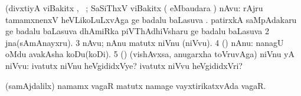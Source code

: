 {\bentry
{} 
\gl{\sanA}
\expl{}
\bmng
(divxtiyA viBakitx  \AtAmx, \pArxparx\ ; SaSiThxV viBakitx  
\bnum
{} ( eMbaudara \bava) nAvu: 
\banum
{}  rAjru tamamxnenxV heVLikoLuLxvAga  ge badalu baLasuva . 
  patirxkA saMpAdakaru  ge badalu baLasuva  
  dhAmiRka piVThAdhiVsharu  ge badalu baLasuva  
\eanum
\numie
\num{2} jna(sAmAnayxru). 
\num{3} nAvu; nAnu matutx niVnu (niVvu). 
\num{4} (\AmA) nAnu:  nanagU oMdu avakAsha koDu(koDi). 
\num{5} (\AmA) (vishAvxsa, anugarxha toVruvAga) niVnu yA niVvu:  ivatutx niVnu heVgididxVye? ivatutx niVvu heVgididxVri? 
\enum
\emng

\noindent 
\gl{\pagu}
\expl{}
\bmng
{} (samAjdalilx) namamx vagaR matutx namage vayxtirikatxvAda vagaR. 
\emng
\eentry

 \bentry
{}
\gl{\saMkiSx}
\expl{}
\bmng
{} 
\emng
\eentry

}
